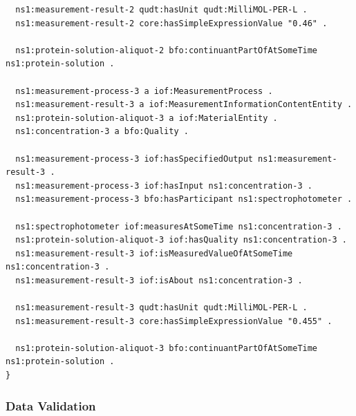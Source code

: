 \begin{verbatim}
  ns1:measurement-result-2 qudt:hasUnit qudt:MilliMOL-PER-L .
  ns1:measurement-result-2 core:hasSimpleExpressionValue "0.46" .
  
  ns1:protein-solution-aliquot-2 bfo:continuantPartOfAtSomeTime ns1:protein-solution .
  
  ns1:measurement-process-3 a iof:MeasurementProcess .
  ns1:measurement-result-3 a iof:MeasurementInformationContentEntity .
  ns1:protein-solution-aliquot-3 a iof:MaterialEntity .
  ns1:concentration-3 a bfo:Quality .
  
  ns1:measurement-process-3 iof:hasSpecifiedOutput ns1:measurement-result-3 .
  ns1:measurement-process-3 iof:hasInput ns1:concentration-3 .
  ns1:measurement-process-3 bfo:hasParticipant ns1:spectrophotometer .
  
  ns1:spectrophotometer iof:measuresAtSomeTime ns1:concentration-3 .
  ns1:protein-solution-aliquot-3 iof:hasQuality ns1:concentration-3 .
  ns1:measurement-result-3 iof:isMeasuredValueOfAtSomeTime ns1:concentration-3 .
  ns1:measurement-result-3 iof:isAbout ns1:concentration-3 .
  
  ns1:measurement-result-3 qudt:hasUnit qudt:MilliMOL-PER-L .
  ns1:measurement-result-3 core:hasSimpleExpressionValue "0.455" .
  
  ns1:protein-solution-aliquot-3 bfo:continuantPartOfAtSomeTime ns1:protein-solution .
}

\end{verbatim}

\subsubsection*{Data Validation}

